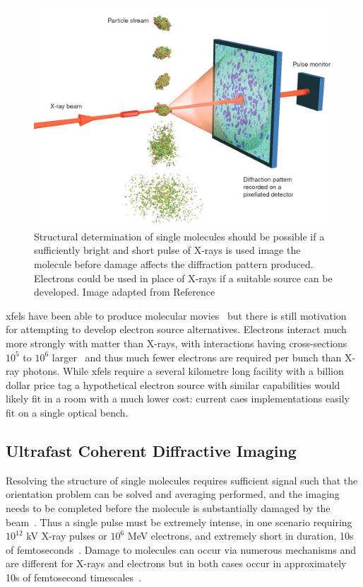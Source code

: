 \begin{figure}
    \center
    \includegraphics[width=0.65\linewidth]{0intro/Figs/single_molecule_cdi.jpg}
    \caption[Structural determination of single molecules.]{Structural determination of single molecules should be possible if a sufficiently bright and short pulse of X-rays is used image the molecule before damage affects the diffraction pattern produced. Electrons could be used in place of X-rays if a suitable source can be developed. Image adapted from Reference~\cite{gaffney_imaging_2007}}
    \label{figure:molecule_cdi}
\end{figure}

\Glspl{xfel} have been able to produce molecular movies~\cite{kupitz_structural_2016,pande_femtosecond_2016,nango_three-dimensional_2016} but there is still motivation for attempting to develop electron source alternatives.
Electrons interact much more strongly with matter than X-rays, with interactions having cross-sections $10^5$ to $10^6$ larger~\cite{sciaini_femtosecond_2011} and thus much fewer electrons are required per bunch than X-ray photons.
While \glspl{xfel} require a several kilometre long facility with a billion dollar price tag a hypothetical electron source with similar capabilities would likely fit in a room with a much lower cost: current \gls{caes} implementations easily fit on a single optical bench.

\subsection{Ultrafast Coherent Diffractive Imaging}

Resolving the structure of single molecules requires sufficient signal such that the orientation problem can be solved and averaging performed, and the imaging needs to be completed before the molecule is substantially damaged by the beam~\cite{huldt_diffraction_2003}.
Thus a single pulse must be extremely intense, in one scenario requiring $10^{12}$ \unit[8]{kV} X-ray pulses or $10^6$ \unit[3]{MeV} electrons, and extremely short in duration, 10s of femtoseconds~\cite{chapman_femtosecond_2006,spence_outrunning_2017}.
Damage to molecules can occur via numerous mechanisms and are different for X-rays and electrons but in both cases occur in approximately 10s of femtosecond timescales~\cite{spence_outrunning_2017}.

